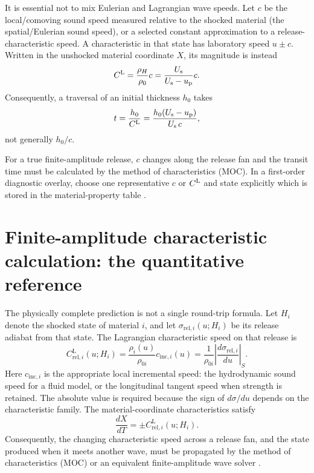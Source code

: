 \documentclass[11pt]{article}
\newcommand{\rhoz}[1][]{\rho_{0#1}}
\newcommand{\Us}[1][]{U_{\mathrm{s}#1}}
\newcommand{\up}[1][]{u_{\mathrm{p}#1}}
\newcommand{\sig}{\sigma}
\begin{document}
It is essential not to mix Eulerian and Lagrangian wave speeds.  Let $c$ be
the local/comoving sound speed measured relative to the shocked material (the
spatial/Eulerian sound speed), or a selected constant approximation to a
release-characteristic speed.  A characteristic in that state has laboratory
speed $u\pm c$.  Written in the unshocked material coordinate $X$, its
magnitude is instead
\begin{equation}
  \CL=\frac{\rho_H}{\rhoz}c
      =\frac{\Us}{\Us-\up}c.
  \label{eq:lagrangian-speed}
\end{equation}
Consequently, a traversal of an initial thickness $h_0$ takes
\begin{equation}
  t=\frac{h_0}{\CL}
   =\frac{h_0(\Us-\up)}{\Us\,c},
  \label{eq:transit-time}
\end{equation}
not generally $h_0/c$.

For a true finite-amplitude release, $c$ changes along the release fan and the
transit time must be calculated by the method of characteristics (MOC).  In a
first-order diagnostic overlay, choose one representative $c$ or $\CL$ and
state explicitly which is stored in the material-property table
\cite{CourantFriedrichs1948,Hawreliak2024}.

\section{Finite-amplitude characteristic calculation: the quantitative reference}
\label{sec:quantitative-reference}

The physically complete prediction is not a single round-trip formula.  Let
$H_i$ denote the shocked state of material $i$, and let
$\sig_{\mathrm{rel},i}(u;H_i)$ be its release adiabat from that state.  The
Lagrangian characteristic speed on that release is
\begin{equation}
  C_{\mathrm{rel},i}^{\mathrm L}(u;H_i)
  =\frac{\rho_i(u)}{\rhoz[i]}c_{\mathrm{inc},i}(u)
  =\frac{1}{\rhoz[i]}
    \left|\frac{d\sig_{\mathrm{rel},i}}{du}\right|_S .
  \label{eq:release-characteristic-speed}
\end{equation}
Here $c_{\mathrm{inc},i}$ is the appropriate local incremental speed: the
hydrodynamic sound speed for a fluid model, or the longitudinal tangent speed
when strength is retained.  The absolute value is required because the sign of
$d\sig/du$ depends on the characteristic family.  The material-coordinate
characteristics satisfy
\begin{equation}
  \frac{dX}{dT}=\pm C_{\mathrm{rel},i}^{\mathrm L}(u;H_i).
  \label{eq:release-characteristics}
\end{equation}
Consequently, the changing characteristic speed across a release fan, and the
state produced when it meets another wave, must be propagated by the method of
characteristics (MOC) or an equivalent finite-amplitude wave solver
\cite{CourantFriedrichs1948,Davison2008}.
\end{document}
